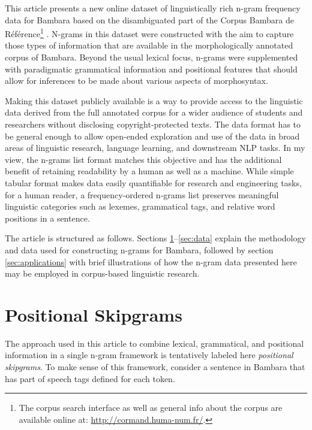 \documentclass[12pt]{article}
\begin{document}
This article presents a new online dataset of linguistically rich
n-gram frequency data for Bambara based on the disambiguated part of
the Corpus Bambara de R\'ef\'erence\footnote{The corpus search
  interface as well as general info about the corpus are available
  online at: \url{http://cormand.huma-num.fr/}.}
\autocite{vydrin2013bamana}. N-grams in this dataset were constructed
with the aim to capture those types of information that are available
in the morphologically annotated corpus of Bambara.  Beyond the usual
lexical focus, n-grams were supplemented with paradigmatic grammatical
information and positional features that should allow
for inferences to be made about various aspects of
morphosyntax. %

Making this dataset publicly available is a way to provide access to
the linguistic data derived from the full annotated corpus for a wider
audience of students and researchers without disclosing
copyright-protected texts. The data format has to be general enough to
allow open-ended exploration and use of the data in broad areas of
linguistic research, language learning, and downstream NLP tasks. In
my view, the n-grams list format matches this objective
and has the additional benefit of retaining readability by a human as
well as a machine. While simple tabular format makes data easily
quantifiable for research and engineering tasks, for a human reader, a
frequency-ordered n-grams list preserves meaningful linguistic
categories such as lexemes, grammatical tags, and relative word positions in
a sentence. %


The article is structured as follows. Sections
\ref{sec:definition}--\ref{sec:data} explain the methodology and data
used for constructing n-grams for Bambara, followed by section
\ref{sec:applications} with brief illustrations of how the n-gram data
presented here may be employed in corpus-based linguistic research.

\section{Positional Skipgrams}
\label{sec:definition}

The approach used in this article to combine lexical, grammatical, and
positional information in a single n-gram framework is tentatively
labeled here \textit{positional skipgrams}.  To make sense of this
framework, consider a sentence in Bambara that has part of speech tags
defined for each token.
\end{document}
